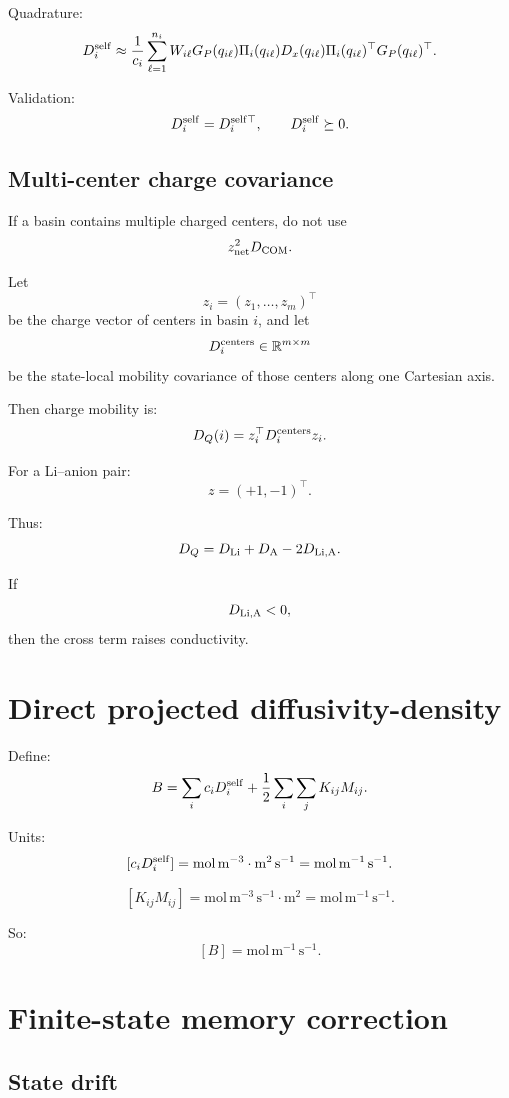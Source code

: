 \documentclass[11pt]{article}
\newcommand{\R}{\mathbb R}
\begin{document}
Quadrature:
\[
D_i^{\rm self}
\approx
\frac{1}{c_i}
\sum_{\ell=1}^{n_i}
W_{i\ell}
G_P(q_{i\ell})
\Pi_i(q_{i\ell})
D_x(q_{i\ell})
\Pi_i(q_{i\ell})^\top
G_P(q_{i\ell})^\top.
\]

Validation:
\[
D_i^{\rm self}=D_i^{\rm self\top},
\qquad
D_i^{\rm self}\succeq0.
\]

\subsection{Multi-center charge covariance}

If a basin contains multiple charged centers, do not use
\[
z_{\rm net}^2D_{\rm COM}.
\]

Let
\[
z_i=(z_1,\ldots,z_m)^\top
\]
be the charge vector of centers in basin \(i\), and let
\[
D_i^{\rm centers}\in\R^{m\times m}
\]
be the state-local mobility covariance of those centers along one Cartesian
axis.

Then charge mobility is:
\[
D_Q(i)=z_i^\top D_i^{\rm centers}z_i.
\]

For a Li--anion pair:
\[
z=(+1,-1)^\top.
\]

Thus:
\[
D_Q
=
D_{\rm Li}
+
D_{\rm A}
-
2D_{\rm Li,A}.
\]

If
\[
D_{\rm Li,A}<0,
\]
then the cross term raises conductivity.

\section{Direct projected diffusivity-density}
\label{sec:directB}

Define:
\[
B
=
\sum_i c_iD_i^{\rm self}
+
\frac{1}{2}\sum_i\sum_jK_{ij}M_{ij}.
\]

Units:
\[
[c_iD_i^{\rm self}]
=
\mathrm{mol\,m^{-3}}\cdot\mathrm{m^2\,s^{-1}}
=
\mathrm{mol\,m^{-1}\,s^{-1}}.
\]

\[
[K_{ij}M_{ij}]
=
\mathrm{mol\,m^{-3}\,s^{-1}}\cdot \mathrm{m^2}
=
\mathrm{mol\,m^{-1}\,s^{-1}}.
\]

So:
\[
[B]=\mathrm{mol\,m^{-1}\,s^{-1}}.
\]

\section{Finite-state memory correction}
\label{sec:finitestate}

\subsection{State drift}
\end{document}
